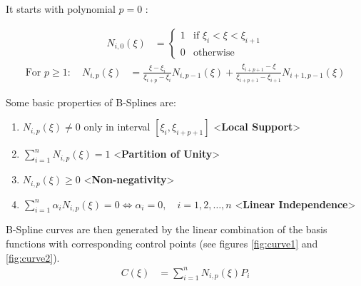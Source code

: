 \documentclass[12pt, a4paper]{report}
\begin{document}
It starts with polynomial $p=0$ :
\begin{center}
\begin{align}
N_{i,0}(\xi) &=
\begin{cases}
    1 & \text{if } \xi_i < \xi < \xi_{i+1} \\
    0 & \text{otherwise}
\end{cases}
\end{align}
\begin{align}
\text{For } p \geq 1: \quad
N_{i,p}(\xi) &= \frac{\xi - \xi_i}{\xi_{i+p} - \xi_i} N_{i,p-1}(\xi) + \frac{\xi_{i+p+1} - \xi}{\xi_{i+p+1} - \xi_{i+1}} N_{i+1,p-1}(\xi)
\end{align}
\end{center}
Some basic properties of B-Splines are:
\begin{enumerate}
    \item $N_{i,p}(\xi) \neq 0$ only in interval $[\xi_i, \xi_{i+p+1}]$ <\textbf{Local Support}>
    \item $\sum_{i=1}^{n} N_{i,p}(\xi) = 1$ <\textbf{Partition of Unity}>
    \item $N_{i,p}(\xi) \geq 0$ <\textbf{Non-negativity}>
    \item $\sum_{i=1}^{n} \alpha_i N_{i,p}(\xi) = 0 \Leftrightarrow \alpha_i = 0, \quad i = 1, 2, \ldots, n$ <\textbf{Linear Independence}>
\end{enumerate}
B-Spline curves are then generated by the linear combination of the basis functions with corresponding control points (see figures \ref{fig:curve1} and \ref{fig:curve2}).
\begin{align}
C(\xi) &= \sum_{i=1}^{n} N_{i,p}(\xi)P_i
\end{align}
\end{document}
